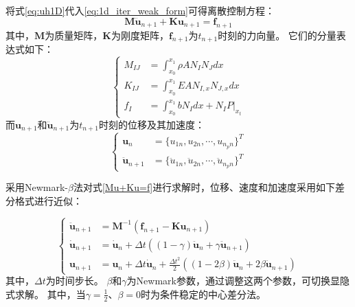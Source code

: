 将式\eqref{eq:uh1D}代入\eqref{eq:1d_iter_weak_form}可得离散控制方程：
\begin{equation}\label{Mu+Ku=f}
\boldsymbol M \ddot{\boldsymbol u}_{n+1} + \boldsymbol K \boldsymbol u_{n+1} = \boldsymbol f_{n+1}
\end{equation}
其中，$\boldsymbol M$为质量矩阵，$\boldsymbol K$为刚度矩阵，$\boldsymbol f_{n+1}$为$t_{n+1}$时刻的力向量。
它们的分量表达式如下：
\begin{equation}
    \left \{ 
        \begin{aligned}
        M_{IJ}  &= \int_{x_0}^{x_1} \rho A N_I N_J dx \\
        K_{IJ}  &= \int_{x_0}^{x_1} EA N_{I,x} N_{J,x} dx \\
        f_{I}   &= \int_{x_0}^{x_1} b N_{I} dx + N_{I} P\vert_{x_t}  
        \end{aligned}
    \right .
\end{equation}
而$\boldsymbol u_{n+1}$和$\ddot {\boldsymbol u}_{n+1}$为$t_{n+1}$时刻的位移及其加速度：
\begin{equation}
    \left \{ 
        \begin{aligned}
        \boldsymbol u_n &= \{u_{1n}, u_{2n}, \cdots, u_{n_p n}\}^T \\ 
        \ddot {\boldsymbol u}_{n+1} &= \{\ddot u_{1n}, \ddot u_{2n}, \cdots, \ddot u_{n_p n}\}^T 
        \end{aligned}
    \right .
\end{equation}

采用Newmark-$\beta$法对式\eqref{Mu+Ku=f}进行求解时，位移、速度和加速度采用如下差分格式进行近似：

\begin{equation}\label{3.2}
\left \{
\begin{split}
\ddot{\boldsymbol{u}}_{n+1} &= \boldsymbol{M}^{-1}(\boldsymbol{f}_{n+1} - \boldsymbol{K} \boldsymbol{u}_{n+1})  \\
\dot{\boldsymbol{u}}_{n+1} &= \dot{\boldsymbol{u}}_n + \Delta t ((1 - \gamma)\ddot{\boldsymbol{u}}_n + \gamma\ddot{\boldsymbol{u}}_{n+1}) \\
\boldsymbol{u}_{n+1} &= \boldsymbol{u}_n + \Delta t \dot{\boldsymbol{u}}_n + \frac{\Delta t^2}{2} \left( (1 - 2\beta)\ddot{\boldsymbol{u}}_n + 2\beta\ddot{\boldsymbol{u}}_{n+1} \right)
\end{split}
\right .
\end{equation}
其中，$\Delta t$为时间步长。
$\beta$和$\gamma$为Newmark参数，通过调整这两个参数，可切换显隐式求解。
其中，当$\gamma = \frac{1}{2}$、$\beta = 0$时为条件稳定的中心差分法。

